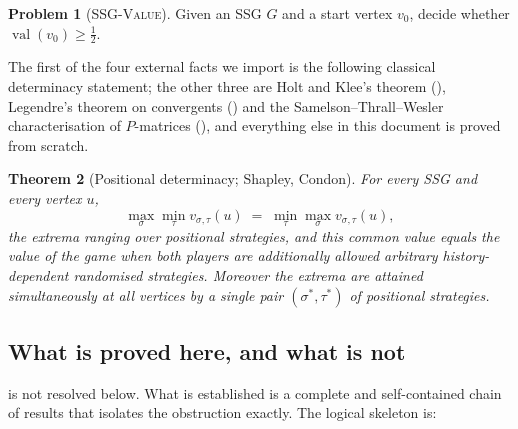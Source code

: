 \documentclass[11pt]{article}
\theoremstyle{plain}
\newtheorem{theorem}{Theorem}[section]
\theoremstyle{definition}
\newtheorem{problem}[theorem]{Problem}
\DeclareMathOperator{\val}{val}
\begin{document}
\begin{problem}[\textsc{SSG-Value}]\label{prob:main}
Given an SSG $G$ and a start vertex $v_0$, decide whether
$\val(v_0)\ge\tfrac12$.
\end{problem}

The first of the four external facts we import is the following
classical determinacy statement; the other three are Holt and Klee's
theorem (), Legendre's theorem on convergents
() and the Samelson--Thrall--Wesler
characterisation of $P$-matrices (), and everything else
in this document is proved from scratch.

\begin{theorem}[Positional determinacy; Shapley, Condon]\label{thm:determinacy}
For every SSG and every vertex $u$,
\[
  \max_\sigma\min_\tau v_{\sigma,\tau}(u)
  \;=\;\min_\tau\max_\sigma v_{\sigma,\tau}(u),
\]
the extrema ranging over positional strategies, and this common value
equals the value of the game when both players are additionally allowed
arbitrary history-dependent randomised strategies. Moreover the
extrema are attained simultaneously at all vertices by a single pair
$(\sigma^\ast,\tau^\ast)$ of positional strategies.
\end{theorem}

\subsection{What is proved here, and what is not}

 is not resolved below. What is established is a complete
and self-contained chain of results that isolates the obstruction
exactly. The logical skeleton is:
\end{document}
